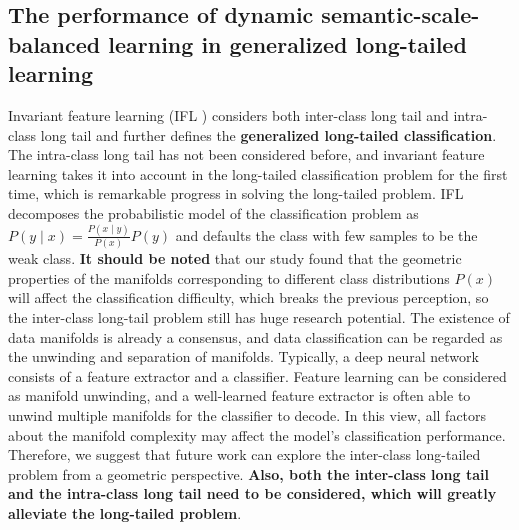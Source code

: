 \documentclass[10pt]{article} %
\begin{document}
\subsection{The performance of dynamic semantic-scale-balanced learning in generalized long-tailed learning\label{5.4}}

Invariant feature learning (IFL \cite{paper115}) considers both inter-class long tail and intra-class long tail and further defines the \textbf{generalized long-tailed classification}. The intra-class long tail has not been considered before, and invariant feature learning takes it into account in the long-tailed classification problem for the first time, which is remarkable progress in solving the long-tailed problem. IFL decomposes the probabilistic model of the classification problem as $P(y\mid x)=\frac{P(x\mid y)}{P(x)}P(y) $ and defaults the class with few samples to be the weak class. \textbf{It should be noted} that our study found that the geometric properties of the manifolds corresponding to different class distributions $P(x)$ will affect the classification difficulty, which breaks the previous perception, so the inter-class long-tail problem still has huge research potential. The existence of data manifolds is already a consensus, and data classification can be regarded as the unwinding and separation of manifolds. Typically, a deep neural network consists of a feature extractor and a classifier. Feature learning can be considered as manifold unwinding, and a well-learned feature extractor is often able to unwind multiple manifolds for the classifier to decode. In this view, all factors about the manifold complexity may affect the model's classification performance. Therefore, we suggest that future work can explore the inter-class long-tailed problem from a geometric perspective. \textbf{Also, both the inter-class long tail and the intra-class long tail need to be considered, which will greatly alleviate the long-tailed problem}.
\end{document}
